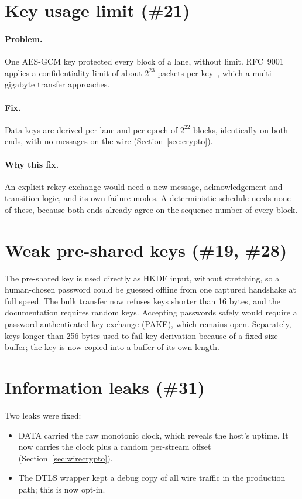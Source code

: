 \section{Key usage limit (\#21)}

\paragraph{Problem.} One AES-GCM key protected every block of a lane, without limit. RFC~9001 applies a
confidentiality limit of about $2^{23}$ packets per key~\cite{rfc9001}, which a multi-gigabyte transfer
approaches.

\paragraph{Fix.} Data keys are derived per lane and per epoch of $2^{22}$ blocks, identically on both ends, with
no messages on the wire (Section~\ref{sec:crypto}).

\paragraph{Why this fix.} An explicit rekey exchange would need a new message, acknowledgement and transition
logic, and its own failure modes. A deterministic schedule needs none of these, because both ends already agree
on the sequence number of every block.

\section{Weak pre-shared keys (\#19, \#28)}

The pre-shared key is used directly as HKDF input, without stretching, so a human-chosen password could be
guessed offline from one captured handshake at full speed. The bulk transfer now refuses keys shorter than 16
bytes, and the documentation requires random keys. Accepting passwords safely would require a
password-authenticated key exchange (PAKE), which remains open. Separately, keys longer than 256 bytes used to
fail key derivation because of a fixed-size buffer; the key is now copied into a buffer of its own length.

\section{Information leaks (\#31)}

Two leaks were fixed:
\begin{itemize}
  \item DATA carried the raw monotonic clock, which reveals the host's uptime. It now carries the clock plus a
    random per-stream offset (Section~\ref{sec:wirecrypto}).
  \item The DTLS wrapper kept a debug copy of all wire traffic in the production path; this is now opt-in.
\end{itemize}

